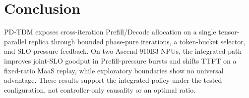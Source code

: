 \section{Conclusion}
\label{sec:conclusion}

PD-TDM exposes cross-iteration Prefill/Decode allocation on a single
tensor-parallel replica through bounded phase-pure iterations, a token-bucket
selector, and SLO-pressure feedback. On two Ascend 910B3 NPUs, the integrated
path improves joint-SLO goodput in Prefill-pressure bursts and shifts TTFT on a
fixed-ratio MaaS replay, while exploratory boundaries show no universal
advantage. These results support the integrated policy under the tested
configuration, not controller-only causality or an optimal ratio.
